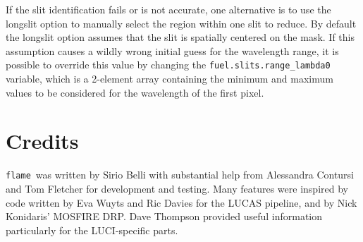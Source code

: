 \documentclass[a4paper, notitlepage]{article}
\newcommand{\flame}{\texttt{flame}}
\begin{document}
If the slit identification fails or is not accurate, one alternative is to use the longslit option to manually select the region within one slit to reduce. By default the longslit option assumes that the slit is spatially centered on the mask. If this assumption causes a wildly wrong initial guess for the wavelength range, it is possible to override this value by changing the \texttt{fuel.slits.range\_lambda0} variable, which is a 2-element array containing the minimum and maximum values to be considered for the wavelength of the first pixel.





\vspace{10mm}

\section*{Credits}

\flame\ was written by Sirio Belli with substantial help from Alessandra Contursi and Tom Fletcher for development and testing. Many features were inspired by code written by Eva Wuyts and Ric Davies for the LUCAS pipeline, and by Nick Konidaris' MOSFIRE DRP. Dave Thompson provided useful information particularly for the LUCI-specific parts.
\end{document}
